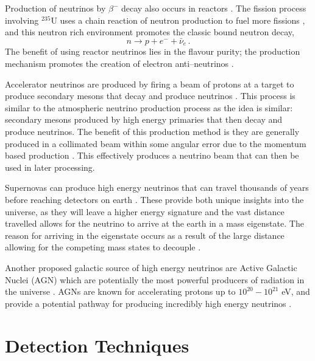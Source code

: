 Production of neutrinos by $\beta^{-}$ decay also occurs in reactors \cite{re_nu}. The fission process involving $^{235}$U uses a chain reaction of neutron production to fuel more fissions \cite{re_nu}, and this neutron rich environment promotes the classic bound neutron decay,
\begin{equation}
  n \to p + e^{-} + \bar{\nu}_{e}\, .
\end{equation}
The benefit of using reactor neutrinos lies in the flavour purity; the production mechanism promotes the creation of electron anti--neutrinos \cite{re_nu}.

Accelerator neutrinos are produced by firing a beam of protons at a target to produce secondary mesons that decay and produce neutrinos \cite{acc_nu}. This process is similar to the atmospheric neutrino production process as the idea is similar: secondary mesons produced by high energy primaries that then decay and produce neutrinos. The benefit of this production method is they are generally produced in a collimated beam within some angular error due to the momentum based production \cite{acc_nu}. This effectively produces a neutrino beam that can then be used in later processing.

Supernovas can produce high energy neutrinos that can travel thousands of years before reaching detectors on earth \cite{sup_nu}. These provide both unique insights into the universe, as they will leave a higher energy signature \cite{sup_nu} and the vast distance travelled allows for the neutrino to arrive at the earth in a mass eigenstate. The reason for arriving in the eigenstate occurs as a result of the large distance allowing for the competing mass states to decouple \cite{sup_nu}. 

Another proposed galactic source of high energy neutrinos are Active Galactic Nuclei (AGN) which are potentially the most powerful producers of radiation in the universe \cite{agn_nu}. AGNs are known for accelerating protons up to $10^{20} - 10^{21}$ eV, and provide a potential pathway for producing incredibly high energy neutrinos \cite{agn_nu}.

\section{Detection Techniques}


